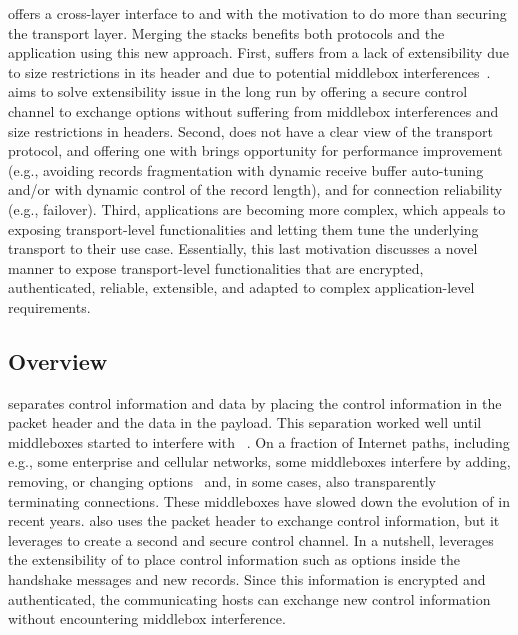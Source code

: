 

\tcpls offers a cross-layer interface to \tls and \tcp with the motivation to do
more than securing the transport layer. Merging the stacks benefits both
protocols and the application using this new approach. First, \tcp suffers from
a lack of extensibility due to size restrictions in its header and due to
potential middlebox interferences~\cite{honda2011still}. \tcpls aims to solve
\tcp extensibility issue in the long run by offering a secure control channel to
exchange \tcp options without suffering from middlebox interferences and size
restrictions in \tcp headers. Second, \tls does not have a clear view of the
transport protocol, and offering one with \tcpls brings opportunity for
performance improvement (e.g., avoiding records fragmentation with dynamic
receive buffer auto-tuning and/or with dynamic control of the record length),
and for connection reliability (e.g., failover).  Third, applications are
becoming more complex, which appeals to exposing transport-level functionalities
and letting them tune the underlying transport to their use case. Essentially,
this last motivation discusses a novel manner to expose transport-level
functionalities that are encrypted, authenticated, reliable, extensible, and
adapted to complex application-level requirements.
\subsection{Overview}

\tcp separates control information and data by placing the control information
in the packet header and the data in the payload. This separation worked well
until middleboxes started to interfere with \tcp~\cite{10.1145/1064413.1064418,
  honda2011still, DHBVD13}.  On a fraction of Internet paths, including e.g.,
some enterprise and cellular networks, some middleboxes interfere by adding,
removing, or changing \tcp options~\cite{wang2011untold, honda2011still,
  xu2015investigating} and, in some cases, also transparently terminating \tcp
connections. These middleboxes have slowed down the evolution of \tcp in recent
years. \tcpls also uses the packet header to exchange \tcp control information,
but it leverages \tls to create a second and secure control channel. In a
nutshell, \tcpls leverages the extensibility of  to place control
information such as \tcp options inside the \tls handshake messages and new \tls
records. Since this information is encrypted and authenticated, the
communicating hosts can exchange new control information without encountering
middlebox interference. 

